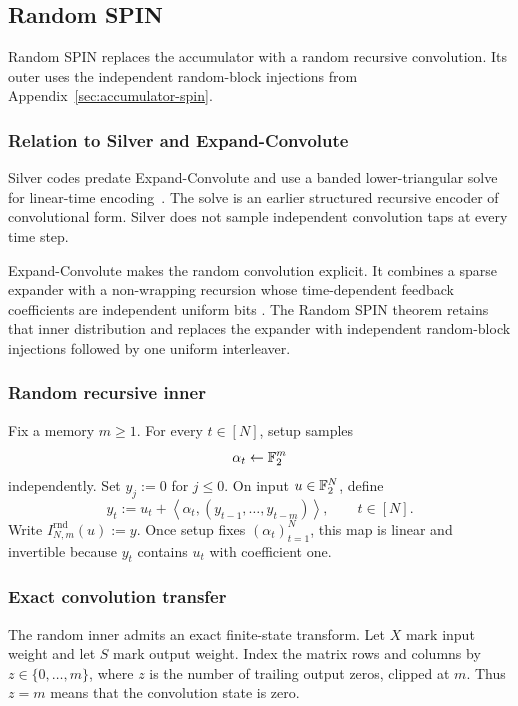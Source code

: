 \subsection{Random SPIN}
\label{sec:random-spin}

Random SPIN replaces the accumulator with a random recursive convolution.
Its outer uses the independent random-block injections from
Appendix~\ref{sec:accumulator-spin}.

\subsubsection{Relation to Silver and Expand-Convolute}

Silver codes predate Expand-Convolute and use a banded lower-triangular solve
for linear-time encoding~\cite{CouteauRindalRaghuraman2021Silver}. The solve
is an earlier structured recursive encoder of convolutional form. Silver does
not sample independent convolution taps at every time step.

Expand-Convolute makes the random convolution explicit. It combines a sparse
expander with a non-wrapping recursion whose time-dependent feedback
coefficients are independent uniform bits
\cite{RaghuramanRindalTanguy2023EC}. The Random SPIN theorem retains that
inner distribution and replaces the expander with independent random-block
injections followed by one uniform interleaver.

\subsubsection{Random recursive inner}

Fix a memory $m\ge1$. For every $t\in[N]$, setup samples
\[
  \alpha_t\gets\mathbb F_2^m
\]
independently. Set $y_j:=0$ for $j\le0$. On input $u\in\mathbb F_2^N$, define
\begin{equation}
  y_t
  :=
  u_t+
  \left\langle
    \alpha_t,(y_{t-1},\ldots,y_{t-m})
  \right\rangle,
  \qquad t\in[N].
  \label{eq:random-recursive-inner}
\end{equation}
Write $I_{N,m}^{\mathrm{rnd}}(u):=y$. Once setup fixes
$(\alpha_t)_{t=1}^N$, this map is linear and invertible because $y_t$ contains
$u_t$ with coefficient one.

\subsubsection{Exact convolution transfer}

The random inner admits an exact finite-state transform. Let $X$ mark input
weight and let $S$ mark output weight. Index the matrix rows and columns by
$z\in\{0,\ldots,m\}$, where $z$ is the number of trailing output zeros,
clipped at $m$. Thus $z=m$ means that the convolution state is zero.

